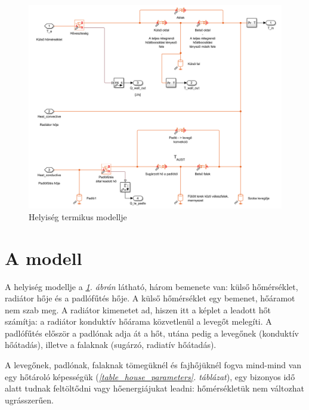  


\begin{figure}[H]
	\centering
	\includegraphics[trim=0 12 5 0, clip,width=\textwidth]{figures/SimscapeHouse}
	\caption{Helyiség termikus modellje}
	\label{fig:SimscapeHouse}
\end{figure}

\section{A modell}

A helyiség modellje a \textit{\ref{fig:SimscapeHouse}. ábrán} látható, három bemenete van: külső hőmérséklet, radiátor hője és a padlófűtés hője.
A külső hőmérséklet egy  bemenet, hőáramot nem szab meg.
A radiátor  kimenetet ad, hiszen itt a képlet a leadott hőt számítja: a radiátor konduktív hőárama közvetlenül a levegőt melegíti. A padlófűtés először a padlónak adja át a hőt, utána pedig a levegőnek (konduktív hőátadás), illetve a falaknak (sugárzó, radiatív hőátadás).

A levegőnek, padlónak, falaknak tömegüknél és fajhőjüknél fogva mind-mind van egy hőtároló képességük (\textit{\ref{table_house_parameters}. táblázat}), egy bizonyos idő alatt tudnak feltöltődni vagy hőenergiájukat leadni: hőmérsékletük nem változhat ugrásszerűen. %


